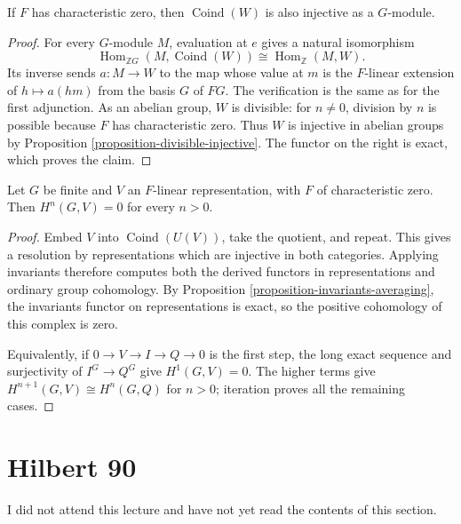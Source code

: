 \begin{proposition}
\label{proposition-coind-injective-4-sept}
If $F$ has characteristic zero, then
$\operatorname{Coind}(W)$ is also
injective as a $G$-module.
\end{proposition}

\begin{proof}
For every $G$-module $M$, evaluation at
$e$ gives a natural isomorphism
$$
\operatorname{Hom}_{\mathbb{Z}G}
(M,\operatorname{Coind}(W))
\cong\operatorname{Hom}_{\mathbb{Z}}(M,W).
$$
Its inverse sends $a:M\to W$ to the map
whose value at $m$ is the $F$-linear
extension of $h\mapsto a(hm)$ from the
basis $G$ of $FG$. The verification is
the same as for the first adjunction.
As an abelian group, $W$ is divisible:
for $n\ne0$, division by $n$ is possible
because $F$ has characteristic zero.
Thus $W$ is injective in abelian groups
by Proposition
\ref{proposition-divisible-injective}.
The functor on the right is exact,
which proves the claim.
\end{proof}

\begin{theorem}
\label{theorem-group-vanishing-4-sept}
Let $G$ be finite and $V$ an $F$-linear
representation, with $F$ of characteristic
zero. Then $H^n(G,V)=0$ for every $n>0$.
\end{theorem}

\begin{proof}
Embed $V$ into $\operatorname{Coind}(U(V))$,
take the quotient, and repeat. This gives
a resolution by representations which are
injective in both categories. Applying
invariants therefore computes both the
derived functors in representations and
ordinary group cohomology.
By Proposition
\ref{proposition-invariants-averaging},
the invariants functor on representations
is exact, so the positive cohomology
of this complex is zero.

Equivalently, if $0\to V\to I\to Q\to0$
is the first step, the long exact sequence
and surjectivity of $I^G\to Q^G$ give
$H^1(G,V)=0$. The higher terms give
$H^{n+1}(G,V)\cong H^n(G,Q)$ for $n>0$;
iteration proves all the remaining cases.
\end{proof}

\section{Hilbert 90}
\label{section-hilberts-theorem-90-4-sept}

\noindent
I did not attend this lecture and have not yet read the contents of this section.

